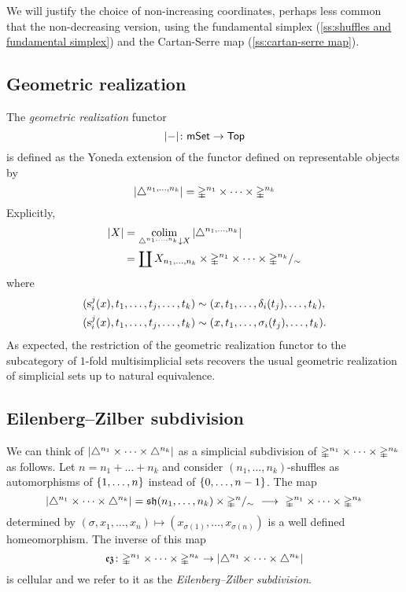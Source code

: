 We will justify the choice of non-increasing coordinates, perhaps less common that the non-decreasing version, using the fundamental simplex (\cref{ss:shuffles and fundamental simplex}) and the Cartan-Serre map (\cref{ss:cartan-serre map}).

\subsection{Geometric realization}

The \textit{geometric realization} functor
\[
\lvert-\rvert \colon \mathsf{mSet} \to \mathsf{Top}
\]
is defined as the Yoneda extension of the functor defined on representable objects by
\[
\lvert\triangle^{n_1, \dots, n_k}\rvert =
\mathbb{\Delta}^{n_1} \times \dots \times \mathbb{\Delta}^{n_k}
\]
Explicitly,
\begin{align*}
	\bars{X} &=
	\colim_{\cramped{\simplex^{n_1, \dots, n_k} \downarrow X}} \, \bars{\simplex^{n_1, \dots, n_k}} \\ &=
	\coprod X_{n_1,\dots,n_k} \times \gsimplex^{n_1} \times \dots \times \gsimplex^{n_k} /_\sim
\end{align*}
where
\[
\begin{split}
(\operatorname{s}_i^j(x), t_1, \dots, t_j, \dots, t_k) &\sim (x, t_1, \dots, \delta_i(t_j), \dots, t_k), \\
(\operatorname{s}^j_i(x), t_1, \dots, t_j, \dots, t_k) &\sim (x, t_1, \dots, \sigma_i(t_j), \dots, t_k).
\end{split}
\]
As expected, the restriction of the geometric realization functor to the subcategory of $1$-fold multisimplicial sets recovers the usual geometric realization of simplicial sets up to natural equivalence.

\subsection{Eilenberg--Zilber subdivision}

We can think of $\lvert\triangle^{n_1} \times \dots \times \triangle^{n_k}\rvert$ as a simplicial subdivision of $\mathbb{\Delta}^{n_1} \times \dots \times \mathbb{\Delta}^{n_k}$ as follows.
Let $n = n_1 + \dots + n_k$ and consider $(n_1, \dots, n_k)$-shuffles as automorphisms of $\{1, \dots, n\}$ instead of $\{0, \dots, n-1\}$.
The map
\[
\lvert\triangle^{n_1} \times \dots \times \triangle^{n_k}\rvert =
\operatorname{\mathfrak{sh}}(n_1, \dots, n_k) \times \mathbb{\Delta}^n /_\sim \ \longrightarrow \
\mathbb{\Delta}^{n_1} \times \dots \times \mathbb{\Delta}^{n_k}
\]
determined by $(\sigma, x_1, \dots, x_n) \mapsto (x_{\sigma(1)}, \dots, x_{\sigma(n)})$ is a well defined homeomorphism.
The inverse of this map
\[
\operatorname{\mathfrak{ez}} \colon
\mathbb{\Delta}^{n_1} \times \dots \times \mathbb{\Delta}^{n_k} \to
\lvert\triangle^{n_1} \times \dots \times \triangle^{n_k}\rvert
\]
is cellular and we refer to it as the \textit{Eilenberg--Zilber subdivision}.


